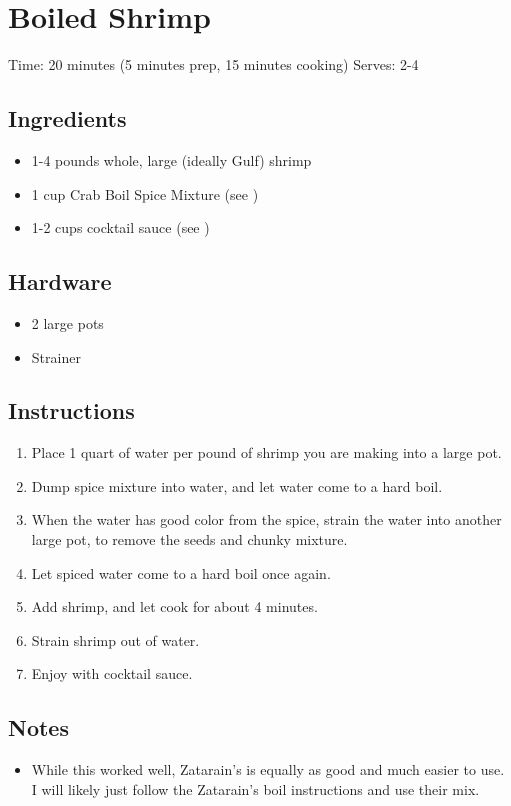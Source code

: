 \section{Boiled Shrimp}
\label{boiledShrimp}
\setcounter{secnumdepth}{0}
Time: 20 minutes (5 minutes prep, 15 minutes cooking)
Serves: 2-4

\begin{multicols}{2}
\subsection*{Ingredients}
\begin{itemize}
    \item 1-4 pounds whole, large (ideally Gulf) shrimp
    \item 1 cup Crab Boil Spice Mixture (see )
    \item 1-2 cups cocktail sauce (see )
\end{itemize}

\subsection*{Hardware}
\begin{itemize}
    \item 2 large pots
    \item Strainer
\end{itemize}
\clearpage

\subsection*{Instructions}
\begin{enumerate}
    \item Place 1 quart of water per pound of shrimp you are making into a large pot.
    \item Dump spice mixture into water, and let water come to a hard boil.
    \item When the water has good color from the spice, strain the water into another large pot, to remove the seeds and chunky mixture.
    \item Let spiced water come to a hard boil once again.
    \item Add shrimp, and let cook for about 4 minutes.
    \item Strain shrimp out of water.
    \item Enjoy with cocktail sauce.

\end{enumerate}

\subsection*{Notes}
\begin{itemize}
    \item While this worked well, Zatarain’s is equally as good and much easier to use. I will likely just follow the Zatarain’s boil instructions and use their mix.
\end{itemize}
\end{multicols}
\clearpage